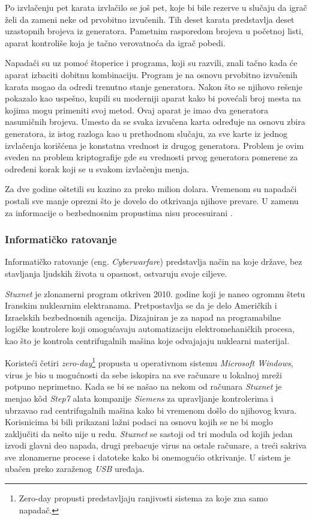 \documentclass[a4paper]{article}
\begin{document}
Po izvlačenju pet karata izvlačilo se još pet, koje bi bile rezerve u slučaju da igrač želi da zameni neke od prvobitno izvučenih. Tih deset karata predstavlja deset uzastopnih brojeva iz generatora. Pametnim rasporedom brojeva u početnoj listi, aparat kontroliše koja je tačno verovatnoća da igrač pobedi. 

Napadači su uz pomoć štoperice i programa, koji su razvili, znali tačno kada će aparat izbaciti dobitnu kombinaciju. Program je na osnovu prvobitno izvučenih karata mogao da odredi trenutno stanje generatora.
Nakon što se njihovo rešenje pokazalo kao uspešno, kupili su moderniji aparat kako bi povećali broj mesta na kojima mogu primeniti svoj metod. Ovaj aparat je imao dva generatora nasumičnih brojeva. Umesto da se svaka izvučena karta određuje na osnovu zbira generatora, iz istog razloga kao u prethodnom slučaju, za sve karte iz jednog izvlačenja korišćena je konstatna vrednost iz drugog generatora. Problem je ovim sveden na problem kriptografije gde su vrednosti prvog generatora pomerene za određeni korak koji se u svakom izvlačenju menja.

Za dve godine oštetili su kazino za preko milion dolara. Vremenom su napadači postali sve manje oprezni što je dovelo do otkrivanja njihove prevare. U zamenu za informacije o bezbednosnim propustima nisu procesuirani \cite{intrusion}.

\subsubsection{Informatičko ratovanje}
\label{cyberwarfare}

Informatičko ratovanje (eng. \textit{Cyberwarfare}) predstavlja način na koje države, bez stavljanja ljudskih života u opasnost, ostvaruju svoje ciljeve.

\textit{Stuxnet} je zlonamerni program otkriven 2010. godine koji je naneo ogromnu štetu Iranskim nuklearnim elektranama. Pretpostavlja se da je delo Američkih i Izraelskih bezbednosnih agencija. Dizajniran je za napad na programabilne logičke kontrolere koji omogućavaju automatizaciju elektromehaničkih procesa, kao što je kontrola centrifugalnih mašina koje odvajajaju nuklearni materijal.

Koristeći četiri \textit{zero-day}\footnote{Zero-day propusti predstavljaju ranjivosti sistema za koje zna samo napadač.} propusta u operativnom sistemu \textit{Microsoft Windows}, virus je bio u mogućnosti da sebe iskopira na sve računare u lokalnoj mreži potpuno neprimetno. Kada se bi se našao na nekom od računara \textit{Stuxnet} je menjao kôd \textit{Step7} alata kompanije \textit{Siemens} za upravljanje kontrolerima i ubrzavao rad centrifugalnih mašina kako bi vremenom došlo do njihovog kvara. Korisnicima bi bili prikazani lažni podaci na osnovu kojih se ne bi moglo zaključiti da nešto nije u redu. \textit{Stuxnet} se sastoji od tri modula od kojih jedan izvodi glavni deo napada, drugi prebacuje virus na ostale računare, a treći sakriva sve zlonamerne procese i datoteke kako bi onemogućio otkrivanje. U sistem je ubačen preko zaraženog \textit{USB} uređaja.
\end{document}
